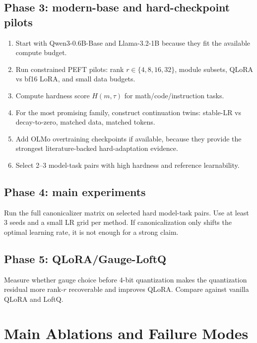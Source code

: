 \documentclass[11pt]{article}
\begin{document}
\subsection{Phase 3: modern-base and hard-checkpoint pilots}

\begin{enumerate}[leftmargin=*]
    \item Start with Qwen3-0.6B-Base and Llama-3.2-1B because they fit the available compute budget.
    \item Run constrained PEFT pilots: rank $r\in\{4,8,16,32\}$, module subsets, QLoRA vs bf16 LoRA, and small data budgets.
    \item Compute hardness score $H(m,\tau)$ for math/code/instruction tasks.
    \item For the most promising family, construct continuation twins: stable-LR vs decay-to-zero, matched data, matched tokens.
    \item Add OLMo overtraining checkpoints if available, because they provide the strongest literature-backed hard-adaptation evidence.
    \item Select 2--3 model-task pairs with high hardness and reference learnability.
\end{enumerate}

\subsection{Phase 4: main experiments}

Run the full canonicalizer matrix on selected hard model-task pairs. Use at least 3 seeds and a small LR grid per method. If canonicalization only shifts the optimal learning rate, it is not enough for a strong claim.

\subsection{Phase 5: QLoRA/Gauge-LoftQ}

Measure whether gauge choice before 4-bit quantization makes the quantization residual more rank-$r$ recoverable and improves QLoRA. Compare against vanilla QLoRA and LoftQ.

\section{Main Ablations and Failure Modes}
\end{document}
